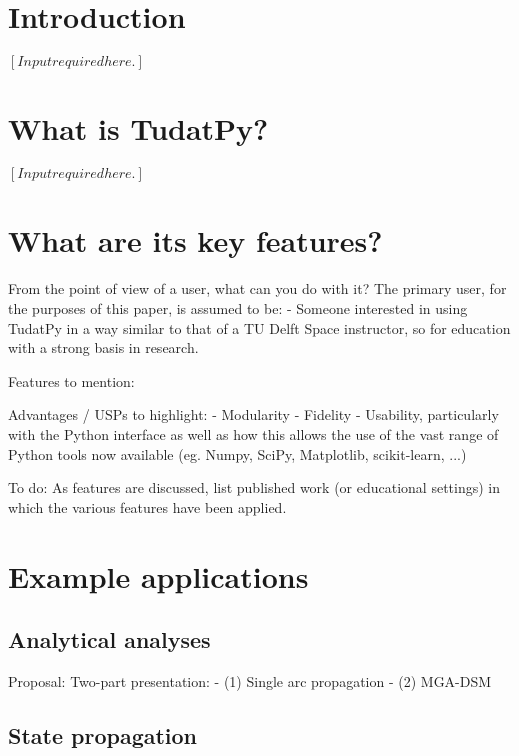 \documentclass[]{IAC_style}
\begin{document}
\section{Introduction}
    $\left[Input required here.\right]$

\section{What is TudatPy?}
    $\left[Input required here.\right]$

\section{What are its key features?}

    From the point of view of a user, what can you do with it?
    The primary user, for the purposes of this paper, is assumed to be:
    - Someone interested in using TudatPy in a way similar to that of a TU Delft Space instructor, so for education with a strong basis in research.

    Features to mention:

    Advantages / USPs to highlight:
    - Modularity
    - Fidelity
    - Usability, particularly with the Python interface as well as how this allows the use of the vast range of Python tools now available (eg. Numpy, SciPy, Matplotlib, scikit-learn, ...)

    To do:
    \left[ \right] As features are discussed, list published work (or educational settings) in which the various features have been applied.


\section{Example applications}

    \subsection{Analytical analyses}
    Proposal: Two-part presentation:
    - (1) Single arc propagation
    - (2) MGA-DSM

    \subsection{State propagation}
\end{document}
